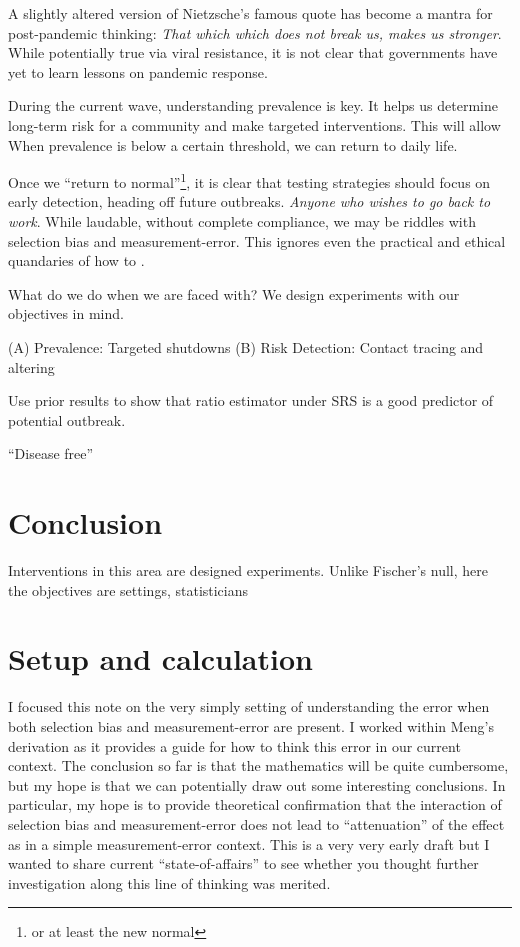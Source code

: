 \documentclass[12pt]{article}
\numberwithin{equation}{section}
\theoremstyle{plain}
\begin{document}
A slightly altered version of Nietzsche's famous quote has become a mantra for post-pandemic thinking: \emph{That which which does not break us, makes us stronger}.  While potentially true via viral resistance, it is not clear that governments have yet to learn lessons on pandemic response.

During the current wave, understanding prevalence is key.  It helps us determine long-term risk for a community and make targeted interventions.  This will allow
When prevalence is below a certain threshold, we can return to daily life.

Once we ``return to normal''\footnote{or at least the new normal}, it is clear that testing strategies should focus on early detection, heading off future outbreaks.
\emph{Anyone who wishes to go back to work}.  While laudable, without complete compliance, we may be riddles with selection bias and measurement-error.  This ignores even the practical and ethical quandaries of how to .

What do we do when we are faced with?  We design experiments with our objectives in mind.

(A) Prevalence: Targeted shutdowns
(B) Risk Detection: Contact tracing and altering

Use prior results to show that ratio estimator under SRS is a good predictor of potential outbreak.

``Disease free''

\section{Conclusion}

Interventions in this area are designed experiments.  Unlike Fischer's null, here the objectives are settings, statisticians

\appendix

\section{Setup and calculation}

I focused this note on the very simply setting of understanding the error when both selection bias and measurement-error are present.  I worked within Meng's derivation as it provides a guide for how to think this error in our current context.  The conclusion so far is that the mathematics will be quite cumbersome, but my hope is that we can potentially draw out some interesting conclusions.  In particular, my hope is to provide theoretical confirmation that the interaction of selection bias and measurement-error does not lead to ``attenuation'' of the effect as in a simple measurement-error context. This is a very very early draft but I wanted to share current ``state-of-affairs'' to see whether you thought further investigation along this line of thinking was merited.
\end{document}
